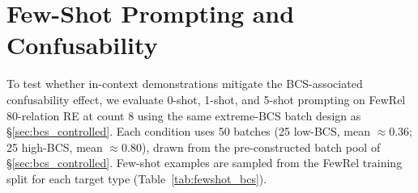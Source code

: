 \documentclass[11pt]{article}
\begin{document}
\begin{table}[h]
\centering
\small
\caption{Cross-model BCS-controlled FewRel RE summary. All models show significant low-vs-high BCS accuracy gaps. Gap magnitude varies with model capacity (ceiling compression), but the direction is consistent across open-weight (8B--70B) and proprietary architectures.}
\label{tab:cross_model_bcs_summary}
\end{table}

\section{Few-Shot Prompting and Confusability}
\label{sec:appendix_fewshot_bcs}

To test whether in-context demonstrations mitigate the BCS-associated confusability effect, we evaluate 0-shot, 1-shot, and 5-shot prompting on FewRel 80-relation RE at count 8 using the same extreme-BCS batch design as \S\ref{sec:bcs_controlled}. Each condition uses 50 batches (25 low-BCS, mean $\approx 0.36$; 25 high-BCS, mean $\approx 0.80$), drawn from the pre-constructed batch pool of \S\ref{sec:bcs_controlled}. Few-shot examples are sampled from the FewRel training split for each target type (Table~\ref{tab:fewshot_bcs}).

\begin{table}[h]
\centering
\small
\caption{BCS gap under few-shot prompting (FewRel, count 8). Demonstrations improve absolute accuracy on low-BCS batches (+3.3--7.2\,pp over 0-shot) but provide inconsistent benefit on high-BCS batches (+5.6\,pp at 1-shot, $-$1.0\,pp at 5-shot). The confusability gap widens from +18.5\,pp (0-shot) to +22.8\,pp (5-shot). All metrics are micro-averaged across batches.}
\label{tab:fewshot_bcs}
\end{table}
\end{document}
